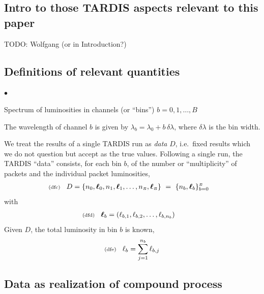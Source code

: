 \documentclass[11pt]{article}
\newcommand{\checked}[1]{\todo[color=green,noline]{\checkmark}} %
\newcommand{\lleq}[1]{\label{#1} }
\renewcommand{\lleq}[1]{\label{#1} {\scriptstyle {\rm (#1)}} \hspace*{2ex} }
\newenvironment{mtemize}{
  \begin{list}{$\bullet$}
    {\setlength{\itemsep}{0pt}
     \setlength{\leftmargin}{3ex}
    }
  }
  {\end{list}}
\newcommand{\smB}{{\scriptscriptstyle B}}
\newcommand{\bml}{{\bm{\ell}}}
\begin{document}
\subsection{Intro to those TARDIS aspects relevant to this paper}

TODO: Wolfgang (or in Introduction?)

\subsection{Definitions of relevant quantities}

\begin{mtemize}
\item Spectrum of luminosities in channels (or ``bins'')
  $b=0,1,\ldots,B$
\item The wavelength of channel $b$ is given by $\lambda_b =
  \lambda_0 + b\,\delta\lambda$, where $\delta\lambda$ is the bin width.

\item We treat the results of a single TARDIS run as \textit{data}
  $D$, i.e.\ fixed results which we do not question but accept as the
  true values.  Following a single run, the TARDIS ``data'' consists,
  for each bin $b$, of the number or ``multiplicity'' of packets and
  the individual packet luminosities,
\begin{align}
  \lleq{dfc}
  D &= \{n_0,\bml_0,n_1,\bml_1,\ldots,n_\smB,\bml_\smB\}
  \ =\ \{n_b,\bml_b\}_{b=0}^\smB
\end{align}
  \checked{}
with
\begin{align}
  \lleq{dfd}
  \bml_b &= (\ell_{b,1},\ell_{b,2},\ldots,\ell_{b,n_b})
\end{align}
  \checked{}
Given $D$, the total luminosity in bin $b$ is known,
\begin{align}
  \lleq{dfe}
  \ell_b = \sum_{j=1}^{n_b}\ell_{b,j}
\end{align}
  \checked{}
\end{mtemize}

\subsection{Data as realization of compound process}
\end{document}
